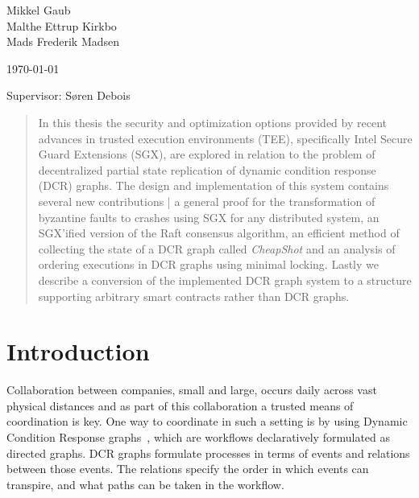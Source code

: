 \documentclass{article}
\begin{document}
\sloppy

\begin{titlepage}

	\vspace{1.5cm}

	{\large Mikkel Gaub \\ Malthe Ettrup Kirkbo \\ Mads Frederik Madsen}

	\vspace{0.5cm}

	\today


	\vspace{\fill}

	{\large Supervisor: Søren Debois}

	\vspace{0.5cm}

	\begin{abstract}
		In this thesis the security and optimization options provided by recent advances in trusted execution environments (TEE), specifically Intel Secure Guard Extensions (SGX), are explored in relation to the problem of decentralized partial state replication of dynamic condition response (DCR) graphs.
		The design and implementation of this system contains several new contributions | a general proof for the transformation of byzantine faults to crashes using SGX for any distributed system, an SGX'ified version of the Raft consensus algorithm, an efficient method of collecting the state of a DCR graph called \textit{CheapShot} and an analysis of ordering executions in DCR graphs using minimal locking.
		Lastly we describe a conversion of the implemented DCR graph system to a structure supporting arbitrary smart contracts rather than DCR graphs.
	\end{abstract}
\end{titlepage}

\clearpage
{}

\tableofcontents

\newpage

\section{Introduction}

	Collaboration between companies, small and large, occurs daily across vast physical distances and as part of this collaboration a trusted means of coordination is key.
	One way to coordinate in such a setting is by using Dynamic Condition Response graphs~\cite{hildebrandt_declarative_2011}, which are workflows declaratively formulated as directed graphs.
	DCR graphs formulate processes in terms of events and relations between those events.
	The relations specify the order in which events can transpire, and what paths can be taken in the workflow.
\end{document}

